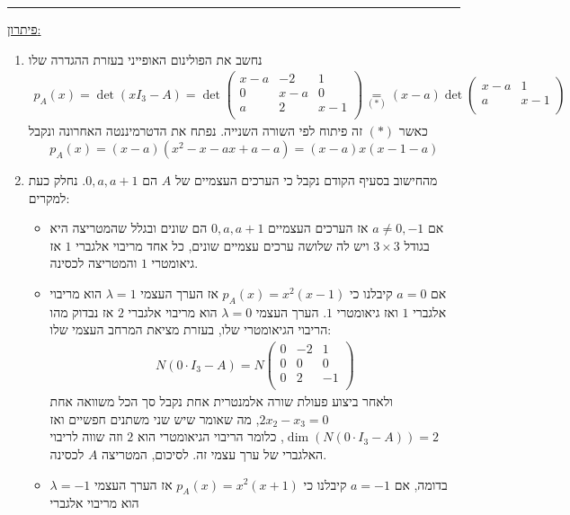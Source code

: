 \documentclass[12pt, a4paper]{article}
\begin{document}
\begin{enumerate}
{\begin{enumerate}
    \end{enumerate}
}\forthQ
\pagebreak
\setcounter{enumi}{0}
    \firstQ
\noindent\rule{\textwidth-30pt}{0.4pt}
\underline{פיתרון:}
    \begin{enumerate}
        \item 
נחשב את הפולינום האופייני בעזרת ההגדרה שלו
\begin{align*}
    p_A(x)=\det(xI_3-A)=
    \det\begin{pmatrix}
        x-a&-2&1\\
        0&x-a&0\\
        a&2&x-1\\
    \end{pmatrix}\underset{(*)}{=}
    (x-a)\det\begin{pmatrix}
        x-a&1\\
        a&x-1\\
    \end{pmatrix}
\end{align*}
כאשר 
$(*)$
זה פיתוח לפי השורה השנייה. 
נפתח את הדטרמיננטה האחרונה ונקבל
$$p_A(x)=(x-a)(x^2-x-ax+a-a)=(x-a)x(x-1-a)$$
        \item 
מהחישוב בסעיף הקודם נקבל כי הערכים העצמיים של
$A$
הם
$0,a,a+1$.
נחלק כעת למקרים:
\begin{itemize}
    \item 
אם
$a\neq 0,-1$
אז הערכים העצמיים
$0,a,a+1$
הם שונים ובגלל שהמטריצה היא בגודל
$3\times3$
ויש לה שלושה ערכים עצמיים שונים, כל אחד מריבוי אלגברי
$1$
אז גיאומטרי
$1$
והמטריצה לכסינה.
    \item 
אם
$a=0$
קיבלנו כי
$p_A(x)=x^2(x-1)$
אז
הערך העצמי
$\lambda=1$
הוא מריבוי אלגברי
$1$
ואז גיאומטרי
$1$.
הערך העצמי
$\lambda=0$
הוא מריבוי אלגברי
$2$
אז נבדוק מהו הריבוי הגיאומטרי שלו, בעזרת מציאת המרחב העצמי שלו:
\begin{align*}
    N(0\cdot I_3-A)=N\begin{pmatrix}
        0&-2&1\\
        0&0&0\\
        0&2&-1\\
    \end{pmatrix}
\end{align*}
ולאחר ביצוע פעולת שורה אלמנטרית אחת נקבל סך הכל משוואה אחת
$2x_2-x_3=0$,
מה שאומר שיש שני משתנים חפשיים ואז
$\dim(N(0\cdot I_3-A))=2$,
כלומר הריבוי הגיאומטרי הוא
$2$
וזה שווה לריבוי האלגברי של ערך עצמי זה. לסיכום, המטריצה 
$A$
לכסינה.
 \item 
 בדומה, 
אם
$a=-1$
קיבלנו כי
$p_A(x)=x^2(x+1)$
אז
הערך העצמי
$\lambda=-1$
הוא מריבוי אלגברי

\end{itemize}
\end{enumerate}
\end{enumerate}
\end{document}
